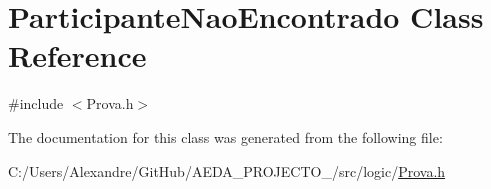 \hypertarget{class_participante_nao_encontrado}{}\section{Participante\+Nao\+Encontrado Class Reference}
\label{class_participante_nao_encontrado}


{\ttfamily \#include $<$Prova.\+h$>$}



The documentation for this class was generated from the following file\+:\begin{DoxyCompactItemize}
\item 
C\+:/\+Users/\+Alexandre/\+Git\+Hub/\+A\+E\+D\+A\+\_\+\+P\+R\+O\+J\+E\+C\+T\+O\+\_/src/logic/\hyperlink{_prova_8h}{Prova.\+h}\end{DoxyCompactItemize}
